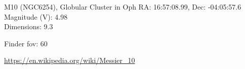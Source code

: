 \begin{block}{M10 (NGC6254), Globular Cluster in Oph}
    RA: 16:57:08.99, Dec: -04:05:57.6 \\ 
    Magnitude (V): 4.98 \\ 
    Dimensions: 9.3 

    Finder fov: 60 

    \url{https://en.wikipedia.org/wiki/Messier_10} 
\end{block}